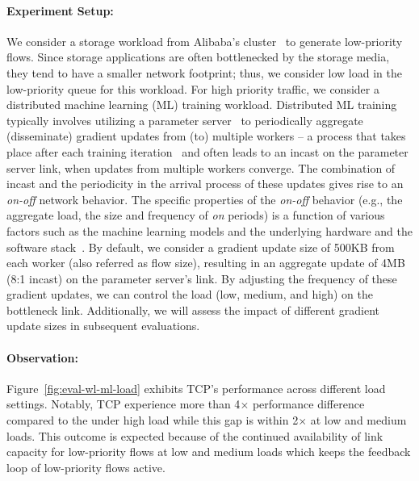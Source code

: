 \paragraph{Experiment Setup:}
We consider a storage workload from Alibaba's cluster~\cite{alibaba_storage} to generate low-priority flows. Since storage applications are often bottlenecked by the storage media, they tend to have a smaller network footprint; thus, we consider low load in the low-priority queue for this workload.
For high priority traffic, we consider a distributed machine learning (ML) training workload.
Distributed ML training typically involves utilizing a parameter server~\cite{psarch-osdi14} to periodically aggregate (disseminate) gradient updates from (to) multiple workers -- a process that takes place after each training iteration~\cite{tiresias} and often leads to an incast on the parameter server link, when updates from multiple workers converge. The combination of incast and the periodicity in the arrival process of these updates gives rise to an \emph{on-off} network behavior.
The specific properties of the \emph{on-off} behavior (e.g., the aggregate load, the size and frequency of \emph{on} periods) is a function of various factors such as the machine learning models and the underlying hardware and the software stack~\cite{tiresias,byteps,theory-distributed-dnn}. 
By default, we consider a gradient update size of 500KB from each worker (also referred as flow size), resulting in an aggregate update of 4MB (8:1 incast) on the parameter server's link. By adjusting the frequency of these gradient updates, we can control the load (low, medium, and high) on the bottleneck link. Additionally, we will assess the impact of different gradient update sizes in subsequent evaluations.

\paragraph{Observation:} 
Figure~\ref{fig:eval-wl-ml-load} exhibits TCP's performance across different load settings. Notably, TCP experience more than 4$\times$ performance difference compared to the \nearopt{} under high load while this gap is within 2$\times$ at low and medium loads. This outcome is expected because of the continued availability of link capacity for low-priority flows at low and medium loads which keeps the feedback loop of low-priority flows active.

